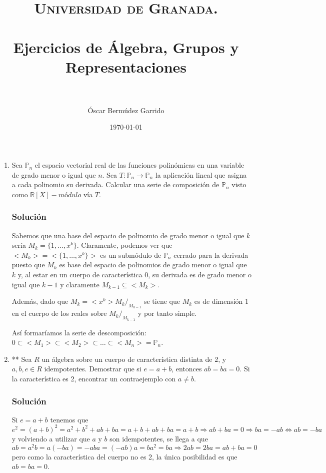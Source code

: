 \documentclass[paper=a4, fontsize=11pt, spanish]{scrartcl}
\title{
  \normalfont \normalsize 
  \textsc{Universidad de Granada.} \\ [25pt] %
  \horrule{0.5pt} \\[0.4cm] %
  \huge Ejercicios de Álgebra, Grupos y Representaciones \\ %
  \horrule{2pt} \\[0.5cm] %
}
\author{Óscar Bermúdez Garrido} %
\date{\normalsize\today} %
\begin{document}
	\maketitle %
	
	\newpage

	\begin{enumerate}
		\item Sea $\mathbb{P}_n$ el espacio vectorial real de las funciones polinómicas en una variable de grado
		menor o igual que $n$. Sea $T: \mathbb{P}_n \rightarrow \mathbb{P}_n$ la aplicación lineal que asigna a
		cada polinomio su derivada. Calcular una serie de composición de $\mathbb{P}_n$ visto como $\mathbb{R}[X]
		-módulo$ vía $T$.
		\subsubsection*{Solución}
		Sabemos que una base del espacio de polinomio de grado menor o igual que $k$ sería $M_k = \{1, \dots, x^k\}$.
		Claramente, podemos ver que $<M_k> = <\{1, \dots, x^k\}>$ es un submódulo de $\mathbb{P}_n$ cerrado para
		la derivada puesto que $M_k$ es base del espacio de polinomios de grado menor o igual que $k$ y, al estar
		en un cuerpo de característica 0, su derivada es de grado menor o igual que $k-1$ y claramente $M_{k-1}
		\subseteq <M_k>$.
		
		Además, dado que $M_k = <x^k> M_k/_{M_{k-1}}$ se tiene que $M_k$ es de dimensión 1 en el cuerpo de los
		reales sobre $M_k/_{M_{k-1}}$ y por tanto simple.
		
		Así formaríamos la serie de descomposición: $0 \subset <M_1> \subset <M_2> \subset \dots \subset <M_n> =
		\mathbb{P}_n$.
		
		\item ** Sea $R$ un álgebra sobre un cuerpo de característica distinta de 2, y $a, b, e \in R$ idempotentes.
		Demostrar que si $e = a + b$, entonces $ab = ba = 0$. Si la característica es 2, encontrar un contraejemplo
		con $a \neq b$.
		\subsubsection*{Solución}
		Si $e = a+b$ tenemos que $e^2 = (a+b)^2 = a^2 + b^2 + ab + ba = a + b + ab + ba = a+b \Rightarrow ab + ba
		= 0 \Rightarrow ba = -ab \Leftrightarrow ab = -ba$ y volviendo a utilizar que $a$ y $b$ son idempotentes,
		se llega a que $ab = a^2b = a(-ba) = -aba = (-ab)a = ba^2 = ba \Rightarrow 2ab = 2ba = ab + ba = 0$ pero
		como la característica del cuerpo no es 2, la única posibilidad es que $ab = ba = 0$.
		

\end{enumerate}
\end{document}
